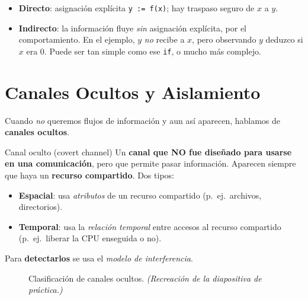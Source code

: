 \documentclass[11pt,a4paper]{article}
\begin{document}
\begin{itemize}[leftmargin=1.4em,itemsep=1pt]
  \item \textbf{Directo}: asignación explícita \texttt{y := f(x)}; hay traspaso seguro de $x$ a
        $y$.
  \item \textbf{Indirecto}: la información fluye \emph{sin} asignación explícita, por el
        comportamiento. En el ejemplo, $y$ \emph{no} recibe a $x$, pero observando $y$ deduzco
        si $x$ era $0$. Puede ser tan simple como ese \texttt{if}, o mucho más complejo.
\end{itemize}

\section{Canales Ocultos y Aislamiento}

Cuando \emph{no} queremos flujos de información y aun así aparecen, hablamos de
\textbf{canales ocultos}.

\begin{defbox}{Canal oculto (covert channel)}
Un \textbf{canal que NO fue diseñado para usarse en una comunicación}, pero que permite pasar
información. Aparecen siempre que haya un \textbf{recurso compartido}. Dos tipos:
\begin{itemize}[leftmargin=1.4em,itemsep=1pt]
  \item \textbf{Espacial}: usa \emph{atributos} de un recurso compartido (p.\ ej.\ archivos,
        directorios).
  \item \textbf{Temporal}: usa la \emph{relación temporal} entre accesos al recurso
        compartido (p.\ ej.\ liberar la CPU enseguida o no).
\end{itemize}
Para \textbf{detectarlos} se usa el \emph{modelo de interferencia}.
\end{defbox}

\begin{figure}[h]
\centering
{}
\caption{Clasificación de canales ocultos. \textit{(Recreación de la diapositiva de práctica.)}}
\end{figure}
\end{document}
